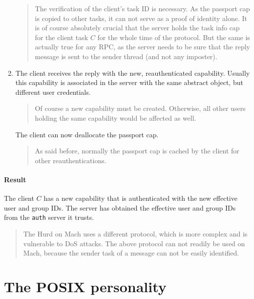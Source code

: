 \documentclass[9pt,a4paper]{extarticle}
\newenvironment{comment}{\footnotesize \begin{quote}}{\end{quote}}
\begin{document}
\begin{enumerate}
  \begin{comment}
    The verification of the client's task ID is necessary.  As the
    passport cap is copied to other tasks, it can not serve as a proof
    of identity alone.  It is of course absolutely crucial that the
    server holds the task info cap for the client task $C$ for the
    whole time of the protocol.  But the same is actually true for any
    RPC, as the server needs to be sure that the reply message is sent
    to the sender thread (and not any imposter).
  \end{comment}
  
\item The client receives the reply with the new, reauthenticated
  capability.  Usually this capability is associated in the server
  with the same abstract object, but different user credentials.

  \begin{comment}
    Of course a new capability must be created.  Otherwise, all other
    users holding the same capability would be affected as well.
  \end{comment}

  The client can now deallocate the passport cap.

  \begin{comment}
    As said before, normally the passport cap is cached by the client
    for other reauthentications.
  \end{comment}
\end{enumerate}

\paragraph{Result}
The client $C$ has a new capability that is authenticated with the new
effective user and group IDs.  The server has obtained the effective
user and group IDs from the \texttt{auth} server it trusts.

\begin{comment}
  The Hurd on Mach uses a different protocol, which is more complex
  and is vulnerable to DoS attacks.  The above protocol can not
  readily be used on Mach, because the sender task of a message can
  not be easily identified.
\end{comment}


\section{The POSIX personality}
\end{document}
